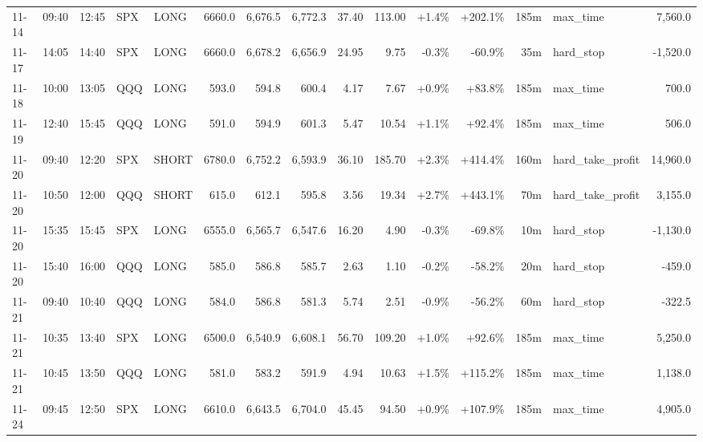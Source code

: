 \documentclass[11pt,a4paper,twoside]{article}
\begin{document}
\begin{landscape}
\begin{center}
\begin{longtable}{>{\color{txtmain}}l l l l l r r r r r r r r >{\color{txtmain}}l r}
11-14 & 09:40 & 12:45 & SPX & LONG & 6660.0 & 6,676.5 & 6,772.3 & 37.40 & 113.00 & \textcolor{wingreen}{+1.4\%} & \textcolor{wingreen}{+202.1\%} & 185m & max\_time & \textcolor{wingreen}{7,560.0} \\
11-17 & 14:05 & 14:40 & SPX & LONG & 6660.0 & 6,678.2 & 6,656.9 & 24.95 & 9.75 & \textcolor{lossred}{-0.3\%} & \textcolor{lossred}{-60.9\%} & 35m & hard\_stop & \textcolor{lossred}{-1,520.0} \\
11-18 & 10:00 & 13:05 & QQQ & LONG & 593.0 & 594.8 & 600.4 & 4.17 & 7.67 & \textcolor{wingreen}{+0.9\%} & \textcolor{wingreen}{+83.8\%} & 185m & max\_time & \textcolor{wingreen}{700.0} \\
11-19 & 12:40 & 15:45 & QQQ & LONG & 591.0 & 594.9 & 601.3 & 5.47 & 10.54 & \textcolor{wingreen}{+1.1\%} & \textcolor{wingreen}{+92.4\%} & 185m & max\_time & \textcolor{wingreen}{506.0} \\
11-20 & 09:40 & 12:20 & SPX & SHORT & 6780.0 & 6,752.2 & 6,593.9 & 36.10 & 185.70 & \textcolor{wingreen}{+2.3\%} & \textcolor{wingreen}{+414.4\%} & 160m & hard\_take\_profit & \textcolor{wingreen}{14,960.0} \\
11-20 & 10:50 & 12:00 & QQQ & SHORT & 615.0 & 612.1 & 595.8 & 3.56 & 19.34 & \textcolor{wingreen}{+2.7\%} & \textcolor{wingreen}{+443.1\%} & 70m & hard\_take\_profit & \textcolor{wingreen}{3,155.0} \\
11-20 & 15:35 & 15:45 & SPX & LONG & 6555.0 & 6,565.7 & 6,547.6 & 16.20 & 4.90 & \textcolor{lossred}{-0.3\%} & \textcolor{lossred}{-69.8\%} & 10m & hard\_stop & \textcolor{lossred}{-1,130.0} \\
11-20 & 15:40 & 16:00 & QQQ & LONG & 585.0 & 586.8 & 585.7 & 2.63 & 1.10 & \textcolor{lossred}{-0.2\%} & \textcolor{lossred}{-58.2\%} & 20m & hard\_stop & \textcolor{lossred}{-459.0} \\
11-21 & 09:40 & 10:40 & QQQ & LONG & 584.0 & 586.8 & 581.3 & 5.74 & 2.51 & \textcolor{lossred}{-0.9\%} & \textcolor{lossred}{-56.2\%} & 60m & hard\_stop & \textcolor{lossred}{-322.5} \\
11-21 & 10:35 & 13:40 & SPX & LONG & 6500.0 & 6,540.9 & 6,608.1 & 56.70 & 109.20 & \textcolor{wingreen}{+1.0\%} & \textcolor{wingreen}{+92.6\%} & 185m & max\_time & \textcolor{wingreen}{5,250.0} \\
11-21 & 10:45 & 13:50 & QQQ & LONG & 581.0 & 583.2 & 591.9 & 4.94 & 10.63 & \textcolor{wingreen}{+1.5\%} & \textcolor{wingreen}{+115.2\%} & 185m & max\_time & \textcolor{wingreen}{1,138.0} \\
11-24 & 09:45 & 12:50 & SPX & LONG & 6610.0 & 6,643.5 & 6,704.0 & 45.45 & 94.50 & \textcolor{wingreen}{+0.9\%} & \textcolor{wingreen}{+107.9\%} & 185m & max\_time & \textcolor{wingreen}{4,905.0} \\

\end{longtable}
\end{center}
\end{landscape}
\end{document}
